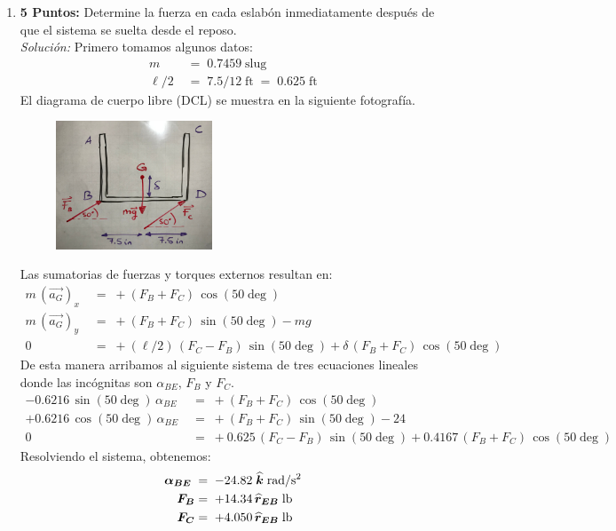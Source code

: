 \documentclass[ a4paper, twoside, 11pt]{article}
\begin{document}
\begin{problem}
\begin{enumerate}[label=\textbf{\alph*)}]
\item \textbf{5 Puntos:} Determine la fuerza en cada eslab\'on inmediatamente despu\'es de que el sistema se suelta desde el reposo. \\[1ex]
\emph{Soluci\'on:} Primero tomamos algunos datos: 
\begin{align*}
m \;
& = \; 0.7459 \; \text{slug} \\
\ell / 2 \;
& = \; 7.5/12 \; \text{ft} \; = \; 0.625 \; \text{ft}
\end{align*}
El diagrama de cuerpo libre (DCL) se muestra en la siguiente fotograf\'ia. 
\begin{figure}[htb]
\centering
\includegraphics[width=0.44\textwidth]{problema-02_DCL.jpg}
\end{figure}

Las sumatorias de fuerzas y torques externos resultan en: 
\begin{align*}
m \, (\vec{a_G})_x \;
& = \; +(F_B + F_C) \, \cos(50\deg) \\
m \, (\vec{a_G})_y \;
& = \; +(F_B + F_C) \, \sin(50\deg) - mg \\
0 \; & = \; + (\ell/2) \, (F_C - F_B) \, \sin(50\deg) + \delta \, (F_B + F_C) \, \cos(50\deg)
\end{align*}
De esta manera arribamos al siguiente sistema de tres ecuaciones lineales donde las inc\'ognitas son $\alpha_{BE}$, $F_B$ y $F_C$. 
\begin{align*}
-0.6216 \, \sin(50\deg) \, \alpha_{BE} \;
& = \; +(F_B + F_C) \, \cos(50\deg) \\
+0.6216 \, \cos(50\deg) \, \alpha_{BE} \;
& = \; +(F_B + F_C) \, \sin(50\deg) - 24 \\
0 \; & = \; + 0.625 \, (F_C - F_B) \, \sin(50\deg) + 0.4167 \, (F_B + F_C) \, \cos(50\deg)
\end{align*}
Resolviendo el sistema, obtenemos: 
\begin{align*}
{\boldsymbol{\alpha_{BE}}} \;
& = \; -24.82 \; {\boldsymbol{\widehat{k}}} \; \text{rad/s\ensuremath{^{\text{2}}}} \\
{\boldsymbol{F_B}} & = \; +14.34 \, {\boldsymbol{\widehat{r}_{EB}}} \; \text{lb} \\
{\boldsymbol{F_C}} & = \; +4.050 \, {\boldsymbol{\widehat{r}_{EB}}} \; \text{lb}
\end{align*}
\end{enumerate}
\QED

\end{problem}
\fullskip
\end{document}
